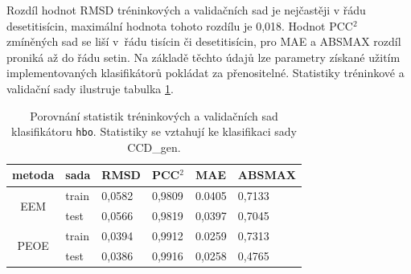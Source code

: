 Rozdíl hodnot RMSD tréninkových a validačních sad je nejčastěji v řádu desetitisícin, maximální hodnota tohoto rozdílu je 0,018. Hodnot PCC$^2$ zmíněných sad se liší v~řádu tisícin či desetitisícin, pro MAE a ABSMAX rozdíl proniká až do řádu setin. Na základě těchto údajů lze  parametry získané užitím implementovaných klasifikátorů pokládat za přenositelné. Statistiky tréninkové a validační sady ilustruje tabulka \ref{prenositelnost}.

\begin{table}[t]
    \renewcommand{\arraystretch}{1.4}
    \centering
    \begin{tabular}{c|l|l|l|l|l}
         \textbf{metoda} & \textbf{sada} & \textbf{RMSD} & \textbf{PCC$^2$} & \textbf{MAE} & \textbf{ABSMAX}\\
         \hline
         \multirow{2}{4em}{EEM} & train & 0,0582 & 0,9809 & 0.0405 & 0,7133  \\
         & test & 0,0566 & 0,9819 & 0,0397 & 0,7045 \\
         \hline
         \multirow{2}{4em}{PEOE} & train & 0,0394 & 0,9912 & 0.0259 & 0,7313  \\
         & test & 0,0386  & 0,9916 & 0,0258 & 0,4765 \\
    \end{tabular}
    \caption{Porovnání statistik tréninkových a validačních sad klasifikátoru \texttt{hbo}. Statistiky se vztahují ke klasifikaci sady CCD\_gen.}
    \label{prenositelnost}
\end{table}

\vspace*{0.2cm}

